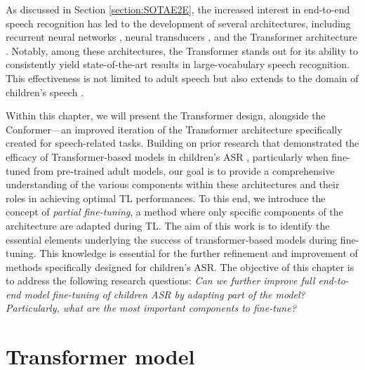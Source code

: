 As discussed in Section \ref{section:SOTAE2E}, the increased interest in end-to-end speech recognition has led to the development of several architectures, including recurrent neural networks \cite{soltau2016neural}, neural transducers \cite{battenberg2017exploring}, and the Transformer architecture \cite{vaswani2017attention}. Notably, among these architectures, the Transformer stands out for its ability to consistently yield state-of-the-art results in large-vocabulary speech recognition. This effectiveness is not limited to adult speech but also extends to the domain of children's speech \cite{gelin2021endtoend,sri_end2end}. %



Within this chapter, we will present the Transformer design, alongside the Conformer—an improved iteration of the Transformer architecture specifically created for speech-related tasks. Building on prior research that demonstrated the efficacy of Transformer-based models in children's \ac{ASR} \cite{gelin2021endtoend,sri_end2end}, particularly when fine-tuned from pre-trained adult models, our goal is to provide a comprehensive understanding of the various components within these architectures and their roles in achieving optimal \ac{TL} performances. To this end, we introduce the concept of \textit{partial fine-tuning}, a method where only specific components of the architecture are adapted during \ac{TL}. The aim of this work is to identify the essential elements underlying the success of transformer-based models during fine-tuning. This knowledge is essential for the further refinement and improvement of methods specifically designed for children's \ac{ASR}. The objective of this chapter is to address the following research questions: \textit{Can we further improve full end-to-end model fine-tuning of children \ac{ASR} by adapting part of the model? Particularly, what are the most important components to fine-tune?}
\section{Transformer model}
\label{sec:trans_archi}

